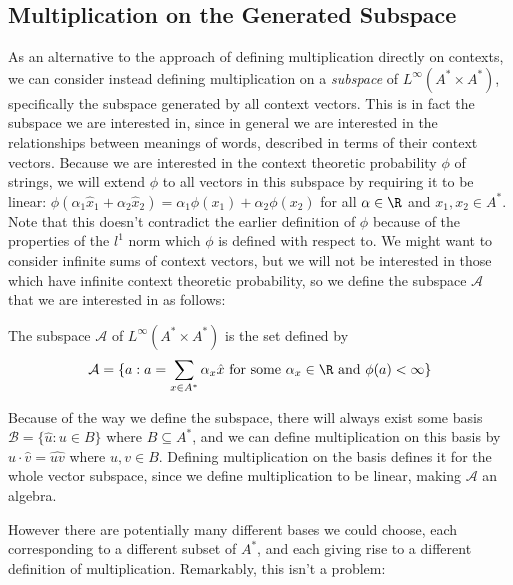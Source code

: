\subsection{Multiplication on the Generated Subspace}

As an alternative to the approach of defining multiplication directly on contexts, we can consider instead defining multiplication on a \emph{subspace} of $L^\infty(A^*\times A^*)$, specifically the subspace generated by all context vectors. This is in fact the subspace we are interested in, since in general we are interested in the relationships between meanings of words, described in terms of their context vectors. Because we are interested in the context theoretic probability $\phi$ of strings, we will extend $\phi$ to all vectors in this subspace by requiring it to be linear: $\phi(\alpha_1 \hat{x}_1 + \alpha_2\hat{x}_2) = \alpha_1\phi(x_1) + \alpha_2\phi(x_2)$ for all $\alpha \in \R$ and $x_1, x_2 \in A^*$. Note that this doesn't contradict the earlier definition of $\phi$ because of the properties of the $l^1$ norm which $\phi$ is defined with respect to. We might want to consider infinite sums of context vectors, but we will not be interested in those which have infinite context theoretic probability, so we define the subspace $\mathcal{A}$ that we are interested in as follows:
\begin{defn}
The subspace $\mathcal{A}$ of $L^\infty(A^*\times A^*)$ is the set defined by
$$\mathcal{A} = \{a : a = \sum_{x\in A^*}\alpha_x \hat{x}\text{ for some }\alpha_x \in \R\text{ and }\phi(a) < \infty\}$$
\end{defn}


Because of the way we define the subspace, there will always exist some basis $\mathcal{B} = \{\hat{u} : u \in B\}$ where $B \subseteq A^*$, and we can define multiplication on this basis by $\hat{u}\cdot\hat{v} = \widehat{uv}$ where $u,v \in B$. Defining multiplication on the basis defines it for the whole vector subspace, since we define multiplication to be linear, making $\mathcal{A}$ an algebra.

However there are potentially many different bases we could choose, each corresponding to a different subset of $A^*$, and each giving rise to a different definition of multiplication. Remarkably, this isn't a problem:

